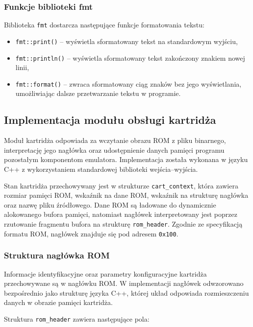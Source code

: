 \documentclass{article}
\begin{document}
\subsubsection{Funkcje biblioteki fmt}

Biblioteka \texttt{fmt} dostarcza następujące funkcje formatowania tekstu:
\begin{itemize}
	\item \texttt{fmt::print()} -- wyświetla sformatowany tekst na standardowym wyjściu,
	\item \texttt{fmt::println()} -- wyświetla sformatowany tekst zakończony znakiem nowej linii,
	\item \texttt{fmt::format()} -- zwraca sformatowany ciąg znaków bez jego wyświetlania,
	umożliwiając dalsze przetwarzanie tekstu w programie.
\end{itemize}


\subsection{Implementacja modułu obsługi kartridża}

Moduł kartridża odpowiada za wczytanie obrazu ROM z pliku binarnego, interpretację jego nagłówka oraz udostępnienie danych pamięci programu pozostałym komponentom emulatora. Implementacja została wykonana w języku C++ z wykorzystaniem standardowej biblioteki wejścia--wyjścia.

Stan kartridża przechowywany jest w strukturze \texttt{cart\_context}, która zawiera rozmiar pamięci ROM, wskaźnik na dane ROM, wskaźnik na strukturę nagłówka oraz nazwę pliku źródłowego. Dane ROM są ładowane do dynamicznie alokowanego bufora pamięci, natomiast nagłówek interpretowany jest poprzez rzutowanie fragmentu bufora na strukturę \texttt{rom\_header}. Zgodnie ze specyfikacją formatu ROM, nagłówek znajduje się pod adresem \texttt{0x100}.

\subsubsection{Struktura nagłówka ROM}

Informacje identyfikacyjne oraz parametry konfiguracyjne kartridża przechowywane są w nagłówku ROM. W implementacji nagłówek odwzorowano bezpośrednio jako strukturę języka C++, której układ odpowiada rozmieszczeniu danych w obrazie pamięci kartridża.

Struktura \texttt{rom\_header} zawiera następujące pola:
\end{document}
